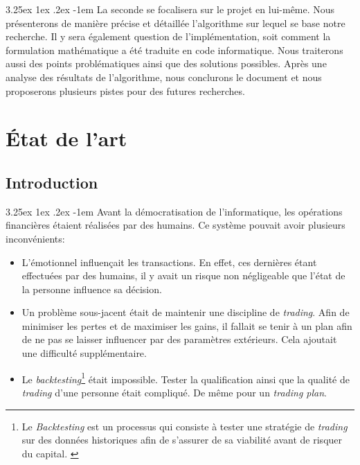 \documentclass[a4paper, 11pt]{article}
\makeatletter
\renewcommand\paragraph{\@startsection{paragraph}{5}{\z@}%
  {3.25ex \@plus1ex \@minus.2ex}%
  {-1em}%
  {\normalfont\normalsize\bfseries}}
\makeatother
\begin{document}
\paragraph{}
La seconde se focalisera sur le projet en lui-même. Nous présenterons de manière précise et détaillée l'algorithme sur lequel se base notre recherche. Il y sera également question de l'implémentation, soit comment la formulation mathématique a été traduite en code informatique. Nous traiterons aussi des points problématiques ainsi que des solutions possibles. Après une analyse des résultats de l'algorithme, nous conclurons le document et nous proposerons plusieurs pistes pour des futures recherches.


\section{État de l'art}
\subsection{Introduction}
\paragraph{}
Avant la démocratisation de l'informatique, les opérations financières étaient réalisées par des humains. 
Ce système pouvait avoir plusieurs inconvénients:
\begin{itemize}
\item L'émotionnel influençait les transactions. En effet, ces dernières étant effectuées par des humains, 
il y avait un risque non négligeable que l'état de la personne influence sa décision.

\item Un problème sous-jacent était de maintenir une discipline de \textit{trading}. 
Afin de minimiser les pertes et de maximiser les gains, il fallait se tenir à un plan afin de ne pas se laisser 
influencer par des paramètres extérieurs. Cela ajoutait une difficulté supplémentaire.

\item Le \textit{backtesting}\footnote{Le \textit{Backtesting} est un processus qui consiste à tester une stratégie
de \textit{trading} sur des données historiques afin de s'assurer de sa viabilité avant de risquer du capital.
\cite{investopedia_backtesting}} 
était impossible. Tester la qualification ainsi que la qualité de \textit{trading} d'une personne était compliqué. 
De même pour un \textit{trading plan}.
\end{itemize}
\end{document}
